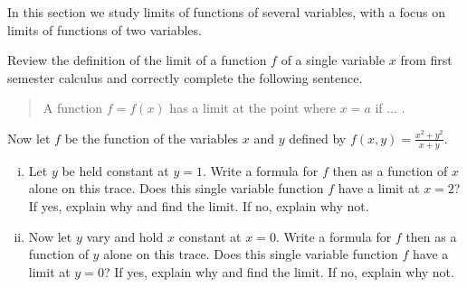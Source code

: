 \begin{pa} \label{PA:10.1} In this section we study limits of
  functions of several variables, with a focus on limits of functions
  of two variables. 

\ba
    \item Review the definition of the limit of a function $f$ of a
      single variable $x$ from first semester calculus and correctly
      complete the following sentence. 


\begin{quote} A function $f = f(x)$ has a limit at the point where
  $x=a$ if ... . 
\end{quote}


\begin{comment}

In single variable calculus we stated that a function $f$ of the
single variable $x$ has a limit $L$ at the point where $x = a$ if we
can make all of the values of $f(x)$ as close as we want to $L$ by
choosing $x$ as close to $a$ (but not equal to $a$) as we need. 

\end{comment}

    \item Now let $f$ be the function of the variables $x$ and $y$
      defined by $f(x,y) = \frac{x^2+y^2}{x+y}$. 
        \begin{enumerate}[i.]
        \item Let $y$ be held constant at $y=1$. Write a formula for
          $f$ then as a function of $x$ alone on this trace. Does this
          single variable function $f$ have a limit at $x=2$? If yes,
          explain why and find the limit. If no, explain why not. 

\begin{comment}

If we hold $y$ constant at $y=1$, then $f(x,1)$ is a function of $x$
alone. More specifically, 
\[f(x,1) = \frac{x^2+1}{x+1}.\]
Since $f(x,1)$ is a quotient of continuous functions and the denominator is defined at $x=2$, we have
\[\lim_{x \to 2} f(x,1) = \frac{2^1+1}{2+1} = \frac{5}{3}.\]

\end{comment}

        \item Now let $y$ vary and hold $x$ constant at $x=0$. Write a
          formula for $f$ then as a function of $y$ alone on this
          trace. Does this single variable function $f$ have a limit
          at $y=0$? If yes, explain why and find the limit. If no,
          explain why not. 


\end{enumerate}
\end{pa}
